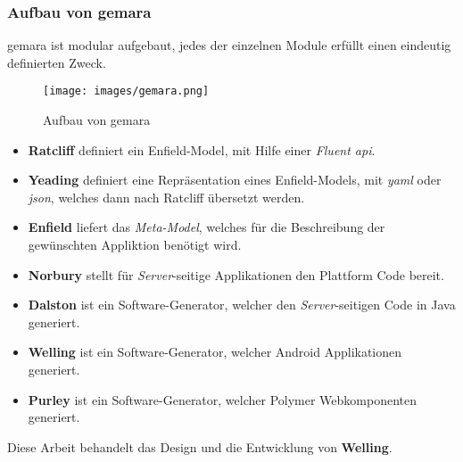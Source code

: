 \newpage

\subsubsection{Aufbau von \acs{gemara}}

\acs{gemara} ist modular aufgebaut, jedes der einzelnen Module erfüllt einen eindeutig definierten Zweck.

\begin{figure}[H]
	\begin{center}
		\texttt{[image: images/gemara.png]}
		\caption{Aufbau von \acs{gemara}}
		\label{fig:gemara}
	\end{center}
\end{figure}

\begin{itemize}
	\item \textbf{Ratcliff} definiert ein Enfield-Model, mit Hilfe einer \textit{Fluent \acs{api}}.
	\item \textbf{Yeading} definiert eine Repräsentation eines Enfield-Models, mit \textit{\acf{yaml}} oder \textit{\acf{json}}, welches dann nach Ratcliff übersetzt werden.
	\item \textbf{Enfield} liefert das \textit{Meta-Model}, welches für die Beschreibung der gewünschten Appliktion benötigt wird.
	\item \textbf{Norbury} stellt für \textit{Server}-seitige Applikationen den Plattform Code bereit.
	\item \textbf{Dalston} ist ein Software-Generator, welcher den \textit{Server}-seitigen Code in Java generiert.
	\item \textbf{Welling} ist ein Software-Generator, welcher Android Applikationen generiert.
	\item \textbf{Purley} ist ein Software-Generator, welcher Polymer Webkomponenten generiert. 
\end{itemize}

Diese Arbeit behandelt das Design und die Entwicklung von \textbf{Welling}.